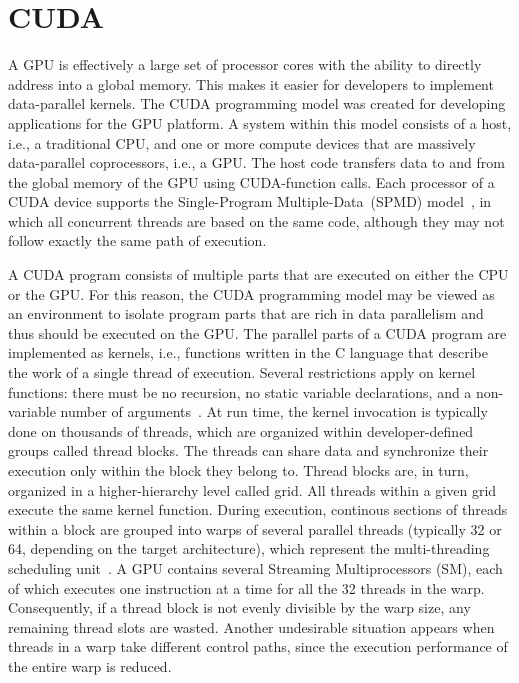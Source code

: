 \section{CUDA \label{sec:02-CUDA}}

A GPU is effectively a large set of processor cores with the ability
to directly address into a global memory. This makes it easier for
developers to implement data-parallel kernels. The CUDA programming
model \cite{CUDA} was created for developing applications for the
GPU platform. A system within this model consists of a host, i.e.,
a traditional CPU, and one or more compute devices that are massively
data-parallel coprocessors, i.e., a GPU. The host code transfers data
to and from the global memory of the GPU using CUDA-function calls.
Each processor of a CUDA device supports the Single-Program Multiple-Data~(SPMD)
model~\cite{Atallah-Algorithms_and_theory_of_computation:2002},
in which all concurrent threads are based on the same code, although
they may not follow exactly the same path of execution.

A CUDA program consists of multiple parts that are executed on either
the CPU or the GPU. For this reason, the CUDA programming model may
be viewed as an environment to isolate program parts that are rich
in data parallelism and thus should be executed on the GPU. The parallel
parts of a CUDA program are implemented as kernels, i.e., functions
written in the C language that describe the work of a single thread
of execution. Several restrictions apply on kernel functions: there
must be no recursion, no static variable declarations, and a non-variable
number of arguments~\cite{Ryoo-Optimization_principles_of_a_GPU_using_CUDA:2008}.
At run time, the kernel invocation is typically done on thousands
of threads, which are organized within developer-defined groups called
thread blocks. The threads can share data and synchronize their execution
only within the block they belong to. Thread blocks are, in turn,
organized in a higher-hierarchy level called grid. All threads within
a given grid execute the same kernel function. During execution, continous
sections of threads within a block are grouped into warps of several
parallel threads (typically 32 or 64, depending on the target architecture),
which represent the multi-threading scheduling unit~\cite{Ryoo-Optimization_principles_of_a_GPU_using_CUDA:2008}.
A GPU contains several Streaming Multiprocessors (SM),
each of which executes one instruction at a time for all the 32 threads
in the warp. Consequently, if a thread block is not evenly divisible
by the warp size, any remaining thread slots are wasted. Another undesirable
situation appears when threads in a warp take different control paths,
since the execution performance of the entire warp is reduced.

